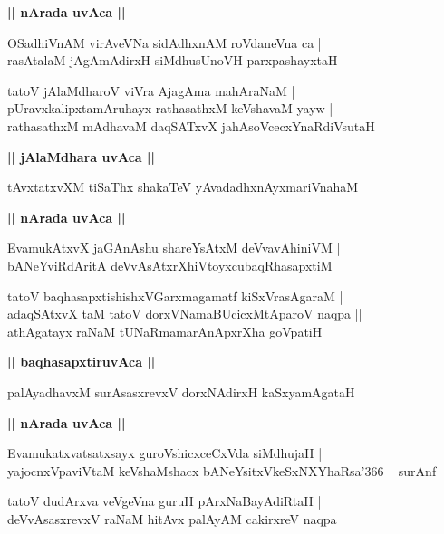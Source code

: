 \documentclass[twoside,12pt,openright]{book}
\newcounter{shloka}[chapter]
\def\uvaca#1{\centerline{{\large\textbf{#1}}}}
\begin{document}
\uvaca{|| nArada uvAca ||}

\begin{shloka}%
OSadhiVnAM virAveVNa sidAdhxnAM roVdaneVna ca |\\
rasAtalaM jAgAmAdirxH siMdhusUnoVH parxpashayxtaH 
\end{shloka}

\begin{shloka}%
tatoV jAlaMdharoV viVra AjagAma mahAraNaM |\\
pUravxkalipxtamAruhayx rathasathxM keVshavaM yayw |\\
rathasathxM mAdhavaM daqSATxvX jahAsoVcecxYnaRdiVsutaH 
\end{shloka}

\uvaca{|| jAlaMdhara uvAca ||}

\begin{shloka}%
tAvxtatxvXM tiSaThx shakaTeV yAvadadhxnAyxmariVnahaM 
\end{shloka}

\uvaca{|| nArada uvAca ||}

\begin{shloka}%
EvamukAtxvX jaGAnAshu shareYsAtxM deVvavAhiniVM |\\
bANeYviRdAritA deVvAsAtxrXhiVtoyxcubaqRhasapxtiM
\end{shloka}

\begin{shloka}%
tatoV baqhasapxtishishxVGarxmagamatf kiSxVrasAgaraM |\\
adaqSAtxvX taM tatoV dorxVNamaBUcicxMtAparoV naqpa ||\\
athAgatayx raNaM tUNaRmamarAnApxrXha goVpatiH
\end{shloka}

\uvaca{|| baqhasapxtiruvAca ||}

\begin{shloka}%
palAyadhavxM surAsasxrevxV dorxNAdirxH kaSxyamAgataH 
\end{shloka}

\uvaca{|| nArada uvAca ||}

\begin{shloka}%
Evamukatxvatsatxsayx guroVshicxceCxVda siMdhujaH |\\
yajocnxVpaviVtaM keVshaMshacx bANeYsitxVkeSxNXYhaRsa\char'366 ~ surAnf 
\end{shloka}

\begin{shloka}%
tatoV dudArxva veVgeVna guruH pArxNaBayAdiRtaH |\\
deVvAsasxrevxV raNaM hitAvx palAyAM cakirxreV naqpa 
\end{shloka}
\end{document}
